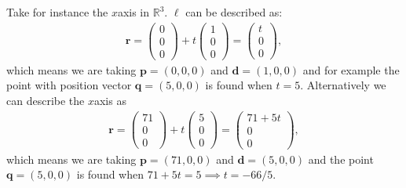 \documentclass[letterpaper,10pt,english]{jupyterBook}
\begin{document}
\sphinxAtStartPar
Take for instance the \(x\)\sphinxhyphen{}axis in \(\mathbb{R}^3\). \(\ell\) can be described as:
\begin{equation*}
\begin{split} \mathbf{r} = \begin{pmatrix} 0 \\ 0 \\ 0 \end{pmatrix} + t \begin{pmatrix} 1 \\ 0 \\ 0 \end{pmatrix} = \begin{pmatrix} t \\ 0 \\ 0 \end{pmatrix}, \end{split}
\end{equation*}
\sphinxAtStartPar
which means we are taking \(\mathbf{p} = (0,0,0)\) and \(\mathbf{d}=(1,0,0)\) and for example the point with position vector \(\mathbf{q} = (5,0,0)\) is found when \(t=5\). Alternatively we can describe the \(x\)\sphinxhyphen{}axis as
\begin{equation*}
\begin{split} \mathbf{r} = \begin{pmatrix} 71 \\ 0 \\ 0 \end{pmatrix} + t \begin{pmatrix} 5 \\ 0 \\ 0 \end{pmatrix} = \begin{pmatrix} 71 + 5t \\ 0 \\ 0 \end{pmatrix}, \end{split}
\end{equation*}
\sphinxAtStartPar
which means we are taking \(\mathbf{p} = (71,0,0)\) and \(\mathbf{d} = (5,0,0)\) and the point \(\mathbf{q} = (5,0,0)\) is found when \(71 +5t = 5 \implies t = -66/5\).
\end{document}
